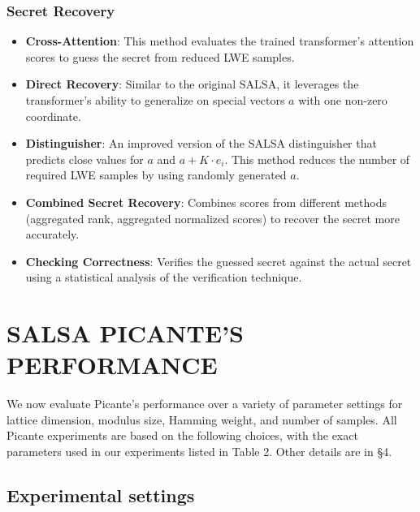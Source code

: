 \documentclass{article}
\begin{document}
\subsubsection{Secret Recovery}

\begin{itemize}
    \item \textbf{Cross-Attention}: This method evaluates the trained transformer's attention scores to guess the secret from reduced LWE samples.
    \item \textbf{Direct Recovery}: Similar to the original SALSA, it leverages the transformer's ability to generalize on special vectors \(a\) with one non-zero coordinate.
    \item \textbf{Distinguisher}: An improved version of the SALSA distinguisher that predicts close values for \(a\) and \(a + K \cdot e_i\). This method reduces the number of required LWE samples by using randomly generated \(a\).
    \item \textbf{Combined Secret Recovery}: Combines scores from different methods (aggregated rank, aggregated normalized scores) to recover the secret more accurately.
    \item \textbf{Checking Correctness}: Verifies the guessed secret against the actual secret using a statistical analysis of the verification technique.
\end{itemize}

\section{SALSA PICANTE'S PERFORMANCE}
\label{sec:salsa_picante_performance}

We now evaluate Picante's performance over a variety of parameter settings for lattice dimension, modulus size, Hamming weight, and number of samples. All Picante experiments are based on the following choices, with the exact parameters used in our experiments listed in Table 2. Other details are in \S4.

\subsection{Experimental settings}
\end{document}
